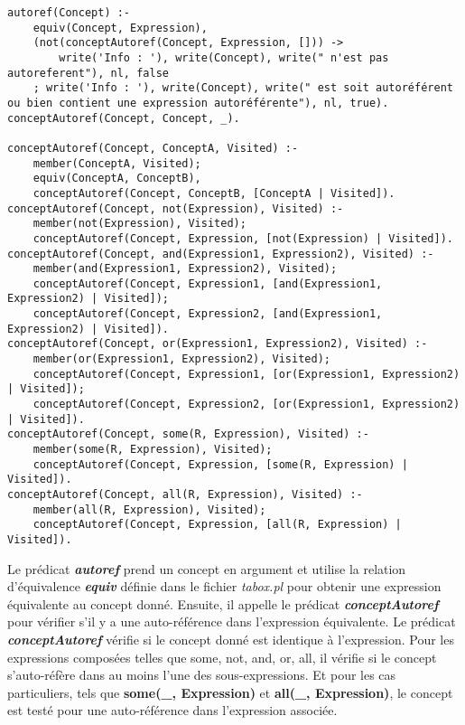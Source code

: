 \documentclass{rapportECL}
\begin{document}
\begin{lstlisting}[style=prologStyle, caption={Verification de l'auto-référencement}, label={autoref}]
autoref(Concept) :-
    equiv(Concept, Expression),
    (not(conceptAutoref(Concept, Expression, [])) ->
        write('Info : '), write(Concept), write(" n'est pas autoreferent"), nl, false
    ; write('Info : '), write(Concept), write(" est soit autoréférent ou bien contient une expression autoréférente"), nl, true).
conceptAutoref(Concept, Concept, _).

conceptAutoref(Concept, ConceptA, Visited) :-
    member(ConceptA, Visited);
    equiv(ConceptA, ConceptB),
    conceptAutoref(Concept, ConceptB, [ConceptA | Visited]).
conceptAutoref(Concept, not(Expression), Visited) :-
    member(not(Expression), Visited);
    conceptAutoref(Concept, Expression, [not(Expression) | Visited]).
conceptAutoref(Concept, and(Expression1, Expression2), Visited) :- 
    member(and(Expression1, Expression2), Visited);
    conceptAutoref(Concept, Expression1, [and(Expression1, Expression2) | Visited]);
    conceptAutoref(Concept, Expression2, [and(Expression1, Expression2) | Visited]).
conceptAutoref(Concept, or(Expression1, Expression2), Visited) :- 
    member(or(Expression1, Expression2), Visited);
    conceptAutoref(Concept, Expression1, [or(Expression1, Expression2) | Visited]);
    conceptAutoref(Concept, Expression2, [or(Expression1, Expression2) | Visited]).
conceptAutoref(Concept, some(R, Expression), Visited) :-
    member(some(R, Expression), Visited);
    conceptAutoref(Concept, Expression, [some(R, Expression) | Visited]).
conceptAutoref(Concept, all(R, Expression), Visited) :-
    member(all(R, Expression), Visited);
    conceptAutoref(Concept, Expression, [all(R, Expression) | Visited]).
\end{lstlisting}

Le prédicat \textbf{\textit{autoref}} prend un concept en argument et utilise la relation d'équivalence \textbf{\textit{equiv}} définie dans le fichier \textit{tabox.pl} pour obtenir une expression équivalente au concept donné. Ensuite, il appelle le prédicat \textbf{\textit{conceptAutoref}} pour vérifier s'il y a une auto-référence dans l'expression équivalente.
Le prédicat \textbf{\textit{conceptAutoref}} vérifie si le concept donné est identique à l'expression. Pour les expressions composées telles que some, not, and, or, all, il vérifie si le concept s'auto-réfère dans au moins l'une des sous-expressions. Et pour les cas particuliers, tels que \textbf{some(\_, Expression)} et \textbf{all(\_, Expression)}, le concept est testé pour une auto-référence dans l'expression associée.
\end{document}
